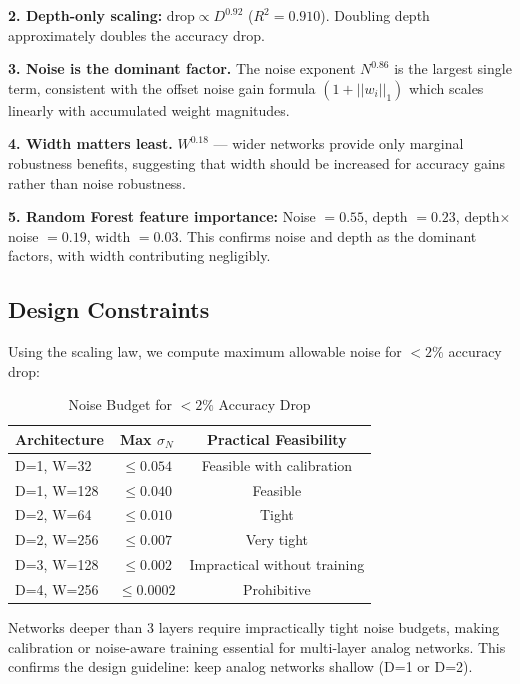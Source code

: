 \documentclass[10pt,twocolumn]{article}
\begin{document}
\textbf{2. Depth-only scaling:} $\text{drop} \propto D^{0.92}$ ($R^2 = 0.910$). Doubling depth approximately doubles the accuracy drop.

\textbf{3. Noise is the dominant factor.} The noise exponent $N^{0.86}$ is the largest single term, consistent with the offset noise gain formula $(1 + ||w_i||_1)$ which scales linearly with accumulated weight magnitudes.

\textbf{4. Width matters least.} $W^{0.18}$ --- wider networks provide only marginal robustness benefits, suggesting that width should be increased for accuracy gains rather than noise robustness.

\textbf{5. Random Forest feature importance:} Noise $= 0.55$, depth $= 0.23$, depth$\times$noise $= 0.19$, width $= 0.03$. This confirms noise and depth as the dominant factors, with width contributing negligibly.

\subsection{Design Constraints}

Using the scaling law, we compute maximum allowable noise for $<2\%$ accuracy drop:

\begin{table}[t]
  \centering
  \caption{Noise Budget for $<2\%$ Accuracy Drop}
  \label{tab:noisebudget}
  \begin{tabular}{lcc}
    \toprule
    Architecture & Max $\sigma_N$ & Practical Feasibility \\
    \midrule
    D=1, W=32 & $\leq 0.054$ & Feasible with calibration \\
    D=1, W=128 & $\leq 0.040$ & Feasible \\
    D=2, W=64 & $\leq 0.010$ & Tight \\
    D=2, W=256 & $\leq 0.007$ & Very tight \\
    D=3, W=128 & $\leq 0.002$ & Impractical without training \\
    D=4, W=256 & $\leq 0.0002$ & Prohibitive \\
    \bottomrule
  \end{tabular}
\end{table}

Networks deeper than 3 layers require impractically tight noise budgets, making calibration or noise-aware training essential for multi-layer analog networks. This confirms the design guideline: keep analog networks shallow (D=1 or D=2).
\end{document}
